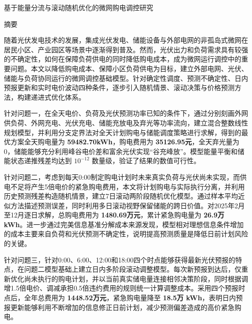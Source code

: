 \begin{center}{\heiti 基于能量分流与滚动随机优化的微网购电调控研究}\end{center}

\vspace{0.5em}
\begin{center}{\heiti 摘\quad 要}\end{center}
\vspace{0.3em}
\begingroup{}\linespread{1.22}\selectfont

随着光伏发电技术的发展，集成光伏发电、储能设备与外部电网的非孤岛式微网在居民小区、产业园区等场景中逐渐得到普及。然而，光伏出力和负荷需求具有较强的不确定性，如何在保障负荷供电的同时降低购电成本，成为微网运行调控中的重要问题。本文以降低购电成本、保障小区负荷供电为目标，建立外部电网、光伏、储能与负荷协同运行的微网调控基础模型。针对确定性调度、预测不确定性、日内预报更新和实时电价波动四种条件，逐步引入随机情景、滚动决策与价格预测方法，构建递进式优化体系。

针对问题一，在全天电价、负荷及光伏预测功率已知的条件下，通过分别刻画外网供负荷、外网充电、光伏充电、储能充放电及弃光等功率流向，建立混合整数线性规划模型，并利用分支定界法对全天计划购电与储能调度策略进行求解，得到的最优方案全天购电量为 \textbf{59482.70kWh}，购电费用为\textbf{ 35126.95元}，全天弃光量为0，储能能够充分利用峰谷电价差和富余光伏实现“谷充峰放”。模型能量平衡和储能状态递推残差均达到 \(10^{-12}\) 数量级，验证了结果的数值可行性。

针对问题二，考虑到每天0:00制定购电计划时未来真实负荷与光伏尚未实现，而供电不足将产生5倍电价的紧急购电费用，本文将计划购电与实际执行分离，并利用历史预测残差构造随机情景，建立7日滚动两阶段随机优化模型。通过样本平均近似方法描述预测误差，同时利用多日滚动视野保留储能的跨日价值。对2025年2月至12月逐日求解，总购电费用为 \textbf{1480.69万元}，累计紧急购电量为 \textbf{26.9万 kWh}。进一步通过完美信息基准分解成本来源发现，模型相对理想信息条件增加的成本主要来自负荷和光伏预测不确定性，说明提高预测质量是降低日前计划风险的关键。

针对问题三，针对0:00、6:00、12:00和18:00四个时点能够获得最新光伏预报的特点，在问题二模型基础上建立日内多阶段滚动调整模型。每次新预报到达后，仅重新优化尚未执行的购电计划，并以当前真实储电量连接相邻决策阶段，同时根据调增1.5倍电价、调减承担0.5倍违约费用的规则统一计算调整成本。采用四个预报时点后，全年总费用为 \textbf{1448.52万元}，紧急购电量降至 \textbf{18.5万 kWh}，表明日内预报更新能够利用不断增加的信息修正日前计划，减少预测偏差造成的高价紧急购电。

